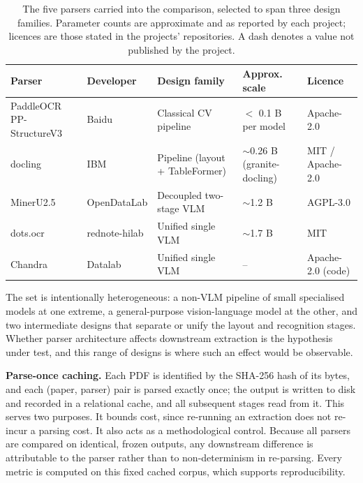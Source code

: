 \documentclass{template}
\begin{document}
\begin{table}[H]
\centering
\caption{The five parsers carried into the comparison, selected to span three design families. Parameter counts are approximate and as reported by each project; licences are those stated in the projects' repositories. A dash denotes a value not published by the project.}
\label{tab:parsers}
\small
\begin{tabularx}{\textwidth}{@{}>{\raggedright\arraybackslash}p{2.7cm} l >{\raggedright\arraybackslash}X >{\raggedright\arraybackslash}X l@{}}
\toprule
\textbf{Parser} & \textbf{Developer} & \textbf{Design family} & \textbf{Approx. scale} & \textbf{Licence} \\
\midrule
PaddleOCR PP-StructureV3 & Baidu & Classical CV pipeline & $<$ 0.1 B per model & Apache-2.0 \\
docling & IBM & Pipeline (layout + TableFormer) & $\sim$0.26 B (granite-docling) & MIT / Apache-2.0 \\
MinerU2.5 & OpenDataLab & Decoupled two-stage VLM & $\sim$1.2 B & AGPL-3.0 \\
dots.ocr & rednote-hilab & Unified single VLM & $\sim$1.7 B & MIT \\
Chandra & Datalab & Unified single VLM & -- & Apache-2.0 (code) \\
\bottomrule
\end{tabularx}
\end{table}

The set is intentionally heterogeneous: a non-VLM pipeline of small specialised models at one extreme, a general-purpose vision-language model at the other, and two intermediate designs that separate or unify the layout and recognition stages. Whether parser architecture affects downstream extraction is the hypothesis under test, and this range of designs is where such an effect would be observable.

\textbf{Parse-once caching.} Each PDF is identified by the SHA-256 hash of its bytes, and each (paper, parser) pair is parsed exactly once; the output is written to disk and recorded in a relational cache, and all subsequent stages read from it. This serves two purposes. It bounds cost, since re-running an extraction does not re-incur a parsing cost. It also acts as a methodological control. Because all parsers are compared on identical, frozen outputs, any downstream difference is attributable to the parser rather than to non-determinism in re-parsing. Every metric is computed on this fixed cached corpus, which supports reproducibility.
\end{document}
